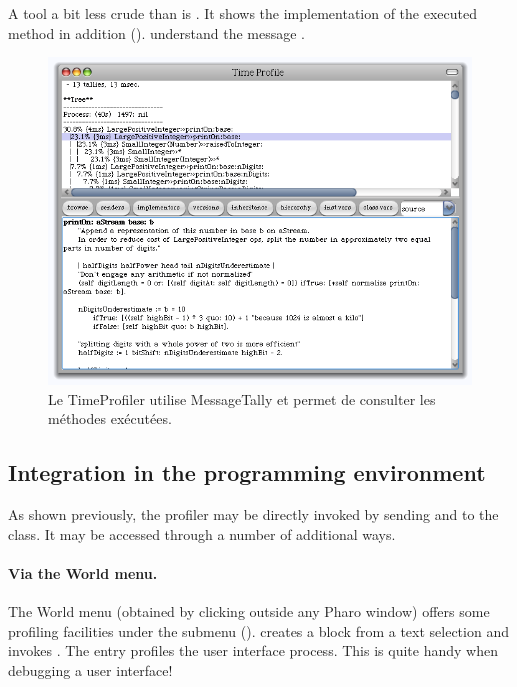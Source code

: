 \documentclass[a4paper,10pt,twoside]{book}
\begin{document}
A tool a bit less crude than  is . It shows the implementation of the executed method in addition ().   understand the message .


\begin{figure}
	\begin{center}
	\includegraphics[width=.8\linewidth]{TimeProfiler}
	\caption{Le TimeProfiler utilise MessageTally et permet de consulter les m\'ethodes ex\'ecut\'ees.
	}
	\end{center}
\end{figure}


\subsection{Integration in the programming environment}
As shown previously, the profiler may be directly invoked by sending  and  to the  class. It may be accessed through a number of additional ways.

\paragraph{Via the World menu.}
The World menu (obtained by clicking outside any Pharo window) offers some profiling facilities under the  submenu ().  creates a block from a text selection and invokes . The entry  profiles the user interface process. This is quite handy when debugging a user interface!
\end{document}
